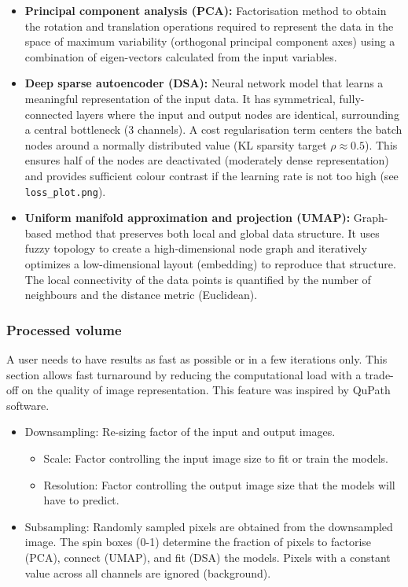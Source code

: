 	\begin{itemize}
		\item \textbf{Principal component analysis (PCA):} Factorisation method to obtain the rotation and translation operations required to represent the data in the space of maximum variability (orthogonal principal component axes) using a combination of eigen-vectors calculated from the input variables.
		
		\item \textbf{Deep sparse autoencoder (DSA):} Neural network model that learns a meaningful representation of the input data. It has symmetrical, fully-connected layers where the input and output nodes are identical, surrounding a central bottleneck (3 channels). A cost regularisation term centers the batch nodes around a normally distributed value (KL sparsity target $\rho \approx 0.5$). This ensures half of the nodes are deactivated (moderately dense representation) and provides sufficient colour contrast if the learning rate is not too high (see \texttt{loss\_plot.png}).
		
		\item \textbf{Uniform manifold approximation and projection (UMAP):} Graph-based method that preserves both local and global data structure. It uses fuzzy topology to create a high-dimensional node graph and iteratively optimizes a low-dimensional layout (embedding) to reproduce that structure. The local connectivity of the data points is quantified by the number of neighbours and the distance metric (Euclidean). 
	\end{itemize}
	
	\subsubsection{Processed volume}
	
	A user needs to have results as fast as possible or in a few iterations only. This section allows fast turnaround by reducing the computational load with a trade-off on the quality of image representation. This feature was inspired by QuPath software.	
	
	\begin{itemize}
		
		\item Downsampling: Re-sizing factor of the input and output images.
			\begin{itemize}				
				\item Scale: Factor controlling the input image size to fit or train the models.
				\item Resolution: Factor controlling the output image size that the models will have to predict.
			\end{itemize}
		\item Subsampling: Randomly sampled pixels are obtained from the downsampled image. The spin boxes (0-1) determine the fraction of pixels to factorise (PCA), connect (UMAP), and fit (DSA) the models. Pixels with a constant value across all channels are ignored (background).
		
	\end{itemize}
	
